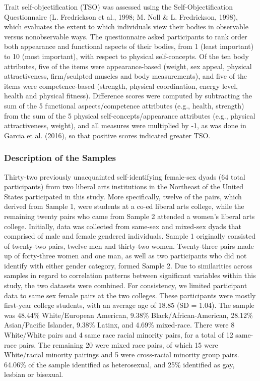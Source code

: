 \documentclass[man]{apa6}
\begin{document}
Trait self-objectification (TSO) was assessed using the
Self-Objectification Questionnaire (L. Fredrickson et al., 1998; M. Noll
\& L. Fredrickson, 1998), which evaluates the extent to which
individuals view their bodies in observable versus nonobservable ways.
The questionnaire asked participants to rank order both appearance and
functional aspects of their bodies, from 1 (least important) to 10 (most
important), with respect to physical self-concepts. Of the ten body
attributes, five of the items were appearance-based (weight, sex appeal,
physical attractiveness, firm/sculpted muscles and body measurements),
and five of the items were competence-based (strength, physical
coordination, energy level, health and physical fitness). Difference
scores were computed by subtracting the sum of the 5 functional
aspects/competence attributes (e.g., health, strength) from the sum of
the 5 physical self-concepts/appearance attributes (e.g., physical
attractiveness, weight), and all measures were multiplied by -1, as was
done in Garcia et al. (2016), so that positive scores indicated greater
TSO.

\subsubsection{Description of the
Samples}\label{description-of-the-samples}

Thirty-two previously unacquainted self-identifying female-sex dyads (64
total participants) from two liberal arts institutions in the Northeast
of the United States participated in this study. More specifically,
twelve of the pairs, which derived from Sample 1, were students at a
co-ed liberal arts college, while the remaining twenty pairs who came
from Sample 2 attended a women's liberal arts college. Initially, data
was collected from same-sex and mixed-sex dyads that comprised of male
and female gendered individuals. Sample 1 originally consisted of
twenty-two pairs, twelve men and thirty-two women. Twenty-three pairs
made up of forty-three women and one man, as well as two participants
who did not identify with either gender category, formed Sample 2. Due
to similarities across samples in regard to correlation patterns between
significant variables within this study, the two datasets were combined.
For consistency, we limited participant data to same sex female pairs at
the two colleges. These participants were mostly first-year college
students, with an average age of 18.85 (SD = 1.04). The sample was
48.44\% White/European American, 9.38\% Black/African-American, 28.12\%
Asian/Pacific Islander, 9.38\% Latinx, and 4.69\% mixed-race. There were
8 White/White pairs and 4 same race racial minority pairs, for a total
of 12 same-race pairs. The remaining 20 were mixed race pairs, of which
15 were White/racial minority pairings and 5 were cross-racial minority
group pairs. 64.06\% of the sample identified as heterosexual, and 25\%
identified as gay, lesbian or bisexual.
\end{document}
